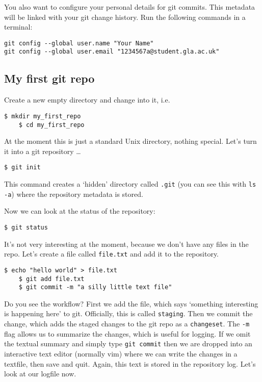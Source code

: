 \documentclass{article}
\begin{document}
You also want to configure your personal details for git commits.
This metadata will be linked with your git change history. 
Run the following commands in a terminal:

\begin{lstlisting}[style=BashInputStyle]
git config --global user.name "Your Name"
git config --global user.email "1234567a@student.gla.ac.uk"
\end{lstlisting}



\subsection*{My first git repo}

Create a new empty directory and change into it, i.e.\
\begin{lstlisting}[style=BashInputStyle]
    $ mkdir my_first_repo
    $ cd my_first_repo
\end{lstlisting}
At the moment this is just a standard Unix directory, nothing special.
Let's turn it into a git repository \ldots
\begin{lstlisting}[style=BashInputStyle]
    $ git init
\end{lstlisting}

This command creates a `hidden' directory called \texttt{.git}
(you can see this with \texttt{ls -a}) where the repository metadata is
stored.

Now we can look at the status of the repository:
\begin{lstlisting}[style=BashInputStyle]
    $ git status
\end{lstlisting}

It's not very interesting at the moment, because we don't have any files
in the repo. Let's create a file called \texttt{file.txt} and
add it to the repository.

\begin{lstlisting}[style=BashInputStyle]
    $ echo "hello world" > file.txt
    $ git add file.txt
    $ git commit -m "a silly little text file"
\end{lstlisting}

Do you see the workflow? First we add the file, which says `something interesting is happening here' to git. Officially, this is called \texttt{staging}. Then we commit the change, which adds the staged changes to the git repo
as a \texttt{changeset}. The \texttt{-m} flag allows us to summarize the
changes, which is useful for logging. If we omit the textual summary and simply type \lstinline{git commit} then we are dropped into an
interactive text editor (normally vim)
where we can write the changes in a textfile, then save and quit. Again, this
text is stored in the repository log. Let's look at our logfile now.
\end{document}
